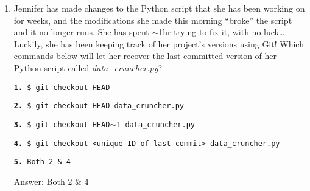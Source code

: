\documentclass[12pt]{article}
\begin{document}
\begin{enumerate}
\item Jennifer has made changes to the Python script that she has been working on for weeks, and the modifications she made this morning “broke” the script and it no longer runs. She has spent $\sim$1hr trying to fix it, with no luck\ldots \\
Luckily, she has been keeping track of her project’s versions using Git! Which commands below will let her recover the last committed version of her Python script called \emph{data\_cruncher.py}?
\begin{flushleft}
\texttt{\textbf{1.} \$ git checkout HEAD}
\end{flushleft}
\begin{flushleft}
\texttt{\textbf{2.} \$ git checkout HEAD data\_cruncher.py}
\end{flushleft}
\begin{flushleft}
\texttt{\textbf{3.} \$ git checkout HEAD$\sim$1 data\_cruncher.py}
\end{flushleft}
\begin{flushleft}
\texttt{\textbf{4.} \$ git checkout <unique ID of last commit> data\_cruncher.py}
\end{flushleft}
\begin{flushleft}
\texttt{\textbf{5.} Both 2 \& 4}
\end{flushleft}
\begin{center}
\textsf{\underline{Answer:} Both 2 \& 4}
\end{center}
\end{enumerate}
\end{document}
